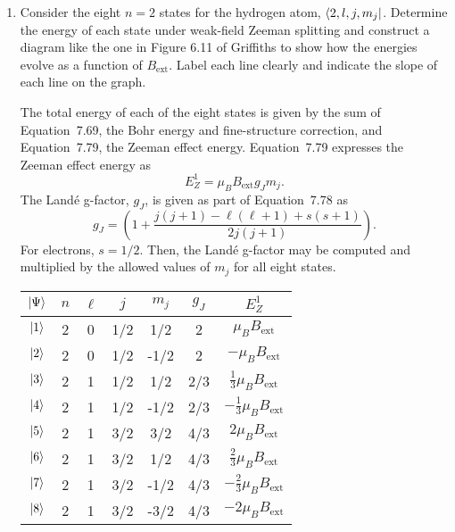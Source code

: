 \documentclass[a4paper, 12pt]{config/homework}
\begin{document}
\begin{enumerate}
\pagebreak
\item Consider the eight \(n=2\) states for the hydrogen atom, \(\bra*{2, l, j, m_j}\). Determine the energy of each state under weak-field Zeeman splitting and construct a diagram like the one in Figure 6.11 of Griffiths to show how the energies evolve as a function of \(B_\text{ext}\). Label each line clearly and indicate the slope of each line on the graph.

The total energy of each of the eight states is given by the sum of Equation~7.69, the Bohr energy and fine-structure correction, and Equation~7.79, the Zeeman effect energy. Equation~7.79 expresses the Zeeman effect energy as
\[E_Z^1 = \mu_B B_\text{ext} g_J m_j.\]
The Land\'{e} g-factor, \(g_J\), is given as part of Equation~7.78 as
\[g_J = \left(1 + \frac{j(j+1)-\ell(\ell+1)+s(s+1)}{2j(j+1)}\right).\]
For electrons, \(s=1/2\). Then, the Land\'{e} g-factor may be computed and multiplied by the allowed values of \(m_j\) for all eight states.
\begin{table}[h]
\centering
\begin{tabular}{c|cccc|cc}
\(\ket*{\Psi}\) & \(n\) & \(\ell\) & \(j\) & \(m_j\) & \(g_J\) & \(E_Z^1\)                           \\ \hline
\(\ket*{1}\)    & 2     & 0        & 1/2   & 1/2     & 2       & \(\mu_B B_\text{ext}\)              \\
\(\ket*{2}\)    & 2     & 0        & 1/2   & -1/2    & 2       & \(-\mu_B B_\text{ext}\)             \\
\(\ket*{3}\)    & 2     & 1        & 1/2   & 1/2     & 2/3     & \(\frac{1}{3}\mu_B B_\text{ext}\)   \\
\(\ket*{4}\)    & 2     & 1        & 1/2   & -1/2    & 2/3     & \(-\frac{1}{3}\mu_B B_\text{ext}\)  \\
\(\ket*{5}\)    & 2     & 1        & 3/2   & 3/2     & 4/3     & \(2 \mu_B B_\text{ext}\)            \\
\(\ket*{6}\)    & 2     & 1        & 3/2   & 1/2     & 4/3     & \(\frac{2}{3} \mu_B B_\text{ext}\)  \\
\(\ket*{7}\)    & 2     & 1        & 3/2   & -1/2    & 4/3     & \(-\frac{2}{3} \mu_B B_\text{ext}\) \\
\(\ket*{8}\)    & 2     & 1        & 3/2   & -3/2    & 4/3     & \(-2\mu_B B_\text{ext}\)
\end{tabular}
\end{table}


\end{enumerate}
\end{document}
